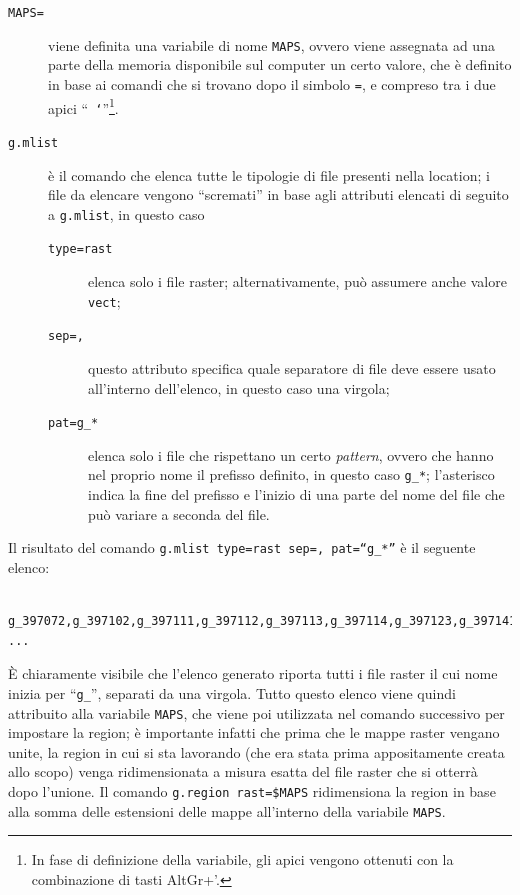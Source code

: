 		\begin{description}
			\item [{\texttt{MAPS=}}] viene definita una variabile di nome \texttt{MAPS}, ovvero viene assegnata ad una parte della memoria disponibile sul computer un certo valore, che è definito in base ai comandi che si trovano dopo il simbolo \texttt{=}, e compreso tra i due apici ``\texttt{ `}''\footnote{In fase di definizione della variabile, gli apici vengono ottenuti con la combinazione di tasti \textsf{AltGr+'}.}.
			\item [{\texttt{g.mlist}}] è il comando che elenca tutte le tipologie di file presenti nella location; i file da elencare vengono ``scremati'' in base agli attributi elencati di seguito a \texttt{g.mlist}, in questo caso
				
				\begin{description}
					\item [{\texttt{type=rast}}] elenca solo i file raster; alternativamente, può assumere anche valore \texttt{vect};
					\item [{\texttt{sep=,}}] questo attributo specifica quale separatore di file deve essere usato all'interno dell'elenco, in questo caso una virgola;
					\item [{\texttt{pat=g\_{*}}}] elenca solo i file che rispettano un certo \emph{pattern}, ovvero che hanno nel proprio nome il prefisso definito, in questo caso \texttt{g\_{*}}; l'asterisco indica la fine del prefisso e l'inizio di una parte del nome del file che può variare a seconda del file.
				\end{description}
		\end{description}
		
		Il risultato del comando \texttt{g.mlist type=rast sep=, pat=``g\_{*}''} è il seguente elenco:
		
		\begin{verbatim}
			g_397072,g_397102,g_397111,g_397112,g_397113,g_397114,g_397123,g_397141, ...
		\end{verbatim}
		
		È chiaramente visibile che l'elenco generato riporta tutti i file raster il cui nome inizia per ``\texttt{g\_}'', separati da una virgola. Tutto questo elenco viene quindi attribuito alla variabile \texttt{MAPS}, che viene poi utilizzata nel comando successivo per impostare la region; è importante infatti che prima che le mappe raster vengano unite, la region in cui si sta lavorando (che era stata prima appositamente creata allo scopo) venga ridimensionata a misura esatta del file raster che si otterrà dopo l'unione. Il comando \texttt{g.region rast=\$MAPS} ridimensiona la region in base alla somma delle estensioni delle mappe all'interno della variabile \texttt{MAPS}.

